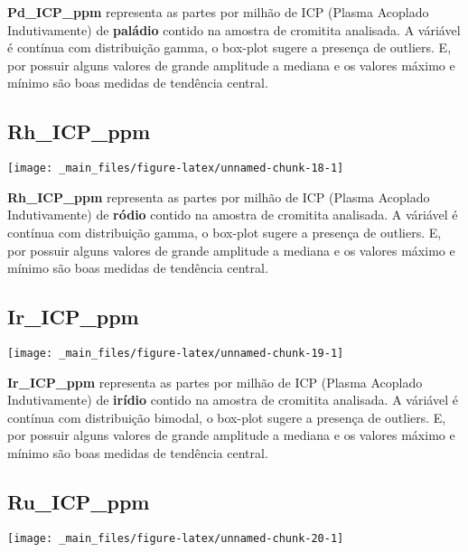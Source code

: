 \documentclass[
]{article}
\begin{document}
\textbf{Pd\_ICP\_ppm} representa as partes por milhão de ICP (Plasma Acoplado Indutivamente) de \textbf{paládio} contido na amostra de cromitita analisada. A váriável é contínua com distribuição gamma, o box-plot sugere a presença de outliers. E, por possuir alguns valores de grande amplitude a mediana e os valores máximo e mínimo são boas medidas de tendência central.

\hypertarget{rh_icp_ppm}{%
\subsection{Rh\_ICP\_ppm}\label{rh_icp_ppm}}

\begin{center}\texttt{[image: \_main\_files/figure-latex/unnamed-chunk-18-1]} \end{center}

\textbf{Rh\_ICP\_ppm} representa as partes por milhão de ICP (Plasma Acoplado Indutivamente) de \textbf{ródio} contido na amostra de cromitita analisada. A váriável é contínua com distribuição gamma, o box-plot sugere a presença de outliers. E, por possuir alguns valores de grande amplitude a mediana e os valores máximo e mínimo são boas medidas de tendência central.

\hypertarget{ir_icp_ppm}{%
\subsection{Ir\_ICP\_ppm}\label{ir_icp_ppm}}

\begin{center}\texttt{[image: \_main\_files/figure-latex/unnamed-chunk-19-1]} \end{center}

\textbf{Ir\_ICP\_ppm} representa as partes por milhão de ICP (Plasma Acoplado Indutivamente) de \textbf{irídio} contido na amostra de cromitita analisada. A váriável é contínua com distribuição bimodal, o box-plot sugere a presença de outliers. E, por possuir alguns valores de grande amplitude a mediana e os valores máximo e mínimo são boas medidas de tendência central.

\hypertarget{ru_icp_ppm}{%
\subsection{Ru\_ICP\_ppm}\label{ru_icp_ppm}}

\begin{center}\texttt{[image: \_main\_files/figure-latex/unnamed-chunk-20-1]} \end{center}
\end{document}
